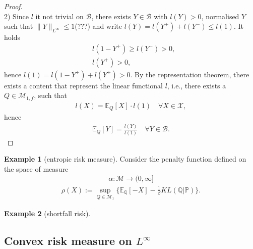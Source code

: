 \documentclass[a4paper,11pt]{book}
\theoremstyle{definition}
\newtheorem*{example}{Example}
\theoremstyle{remark}
\begin{document}
\begin{proof}
\quad\\
2) Since $l$ it not trivial on $\mathcal{B}$, there exists $Y \in \mathcal{B}$ with $l(Y) > 0$, normalised $Y$ such that $\|Y\|_{L^\infty} \le 1$(???) and write $l(Y) = l(Y^+) + l(Y^-) \le l(1) $. It holds
\begin{align*}
	& l(1 - Y^+) \ge l(Y^-) > 0, \\
	& l(Y^+) > 0,	
\end{align*}
hence $l(1) = l(1 - Y^+) + l(Y^+) > 0$. By the representation theorem, there exists a content that represent the linear functional $l$, i.e., there exists a $Q \in \mathcal{M}_{1, f}$, such that
\begin{align*}
	l(X) = \mathbb{E}_Q[X] \cdot l(1) \quad \forall X \in \mathcal{X}, 
\end{align*} 
hence
\begin{align*}
	\mathbb{E}_Q  [Y] = \frac{l(Y)}{l(1)} \quad \forall Y \in \mathcal{B}. 
\end{align*}
\end{proof}




\begin{example}[entropic risk measure]
Consider the penalty function defined on the space of measure
\begin{align*}
	\alpha: \mathcal{M} \rightarrow (0, \infty]
\end{align*}
\begin{align*}
	\rho(X):= \sup_{Q \in \mathcal{M}_1} \bigg\{ \mathbb{E}_{\mathbb{Q}} [-X] - \frac{1}{\beta} KL(\mathbb{Q}|\mathbb{P}) \bigg\}.
\end{align*}
\end{example}

\begin{example}[shortfall risk]
	
\end{example}

\subsection{Convex risk measure on $L^\infty$}
\end{document}
